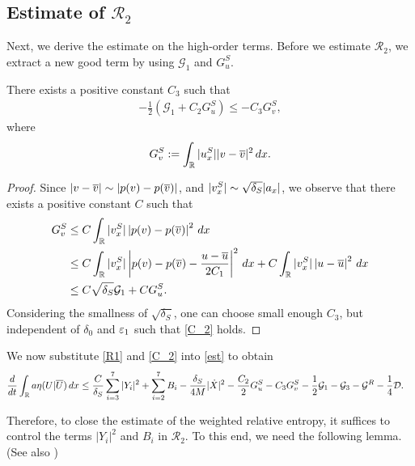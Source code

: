 \documentclass[11pt,reqno]{amsart}
\begin{document}
\subsection{Estimate of $\mathcal{R}_2$} \label{Est-Remaining-terms} 
Next, we derive the estimate on the high-order terms. Before we estimate $\mathcal{R}_2$, we extract a new good term by using $\mathcal{G}_1$ and $G^S_u$.
\begin{lemma} There exists a positive constant $C_3$ such that
    \begin{align} \label{C_2}
        -\frac{1}{2}( \mathcal{G}_1 +C_2 G^S_u ) \le -C_3 G^S_v, 
    \end{align}
where 
\begin{align*} %
    G^S_v:=\int_\mathbb{R}|\us_x||v-\ov|^2 \, dx .
\end{align*}
\end{lemma}
\begin{proof}
    Since $|v-\overline{v}|\sim|p(v)-p(\overline{v})|$, and $|v^S_x| \sim \sqrt{\delta_S}|a_x|$, we observe that there exists a positive constant $C$ such that 
    \begin{align*}
        G^S_v &\le C \int_\mathbb{R} |v^S_x| \left|p(v)-p(\overline{v})\right|^2 \, dx  \\ 
        &\le C  \int_\mathbb{R} |v^S_x| \left|p(v)-p(\overline{v}) - \frac{u-\overline{u}}{2C_1}\right|^2 \, dx +C  \int_\mathbb{R} |v^S_x| \left|u-\overline{u}\right|^2 \, dx \\ 
        &\le C \sqrt{\delta_S} \mathcal{G}_1 + C G^S_u.
   \end{align*}
Considering the smallness of $\sqrt{\delta_S}$, one can choose small enough $C_3$, but independent of $\delta_0$ and $\varepsilon_1$ such that \eqref{C_2} holds.
\end{proof}
    
We now substitute \eqref{R1} and \eqref{C_2} into \eqref{est} to obtain
\begin{equation}\label{est-R}
    \begin{aligned}{}
    \frac{d}{dt} \int_\mathbb{R} a \eta(U|\overline{U}) \, dx &\le \frac{C}{\delta_S}\sum_{i=3}^7 |Y_i|^2 +\sum_{i=2}^7B_i 
     -\frac{\delta_S}{4M} |\dot{X}|^2 -\frac{C_2}{2}G^S_u -C_3 G^S_v -\frac{1}{2}\mathcal{G}_1-\mathcal{G}_3 -\mathcal{G}^R-\frac{1}{4}\mathcal{D}.
    \end{aligned}
\end{equation}

Therefore, to close the estimate of the weighted relative entropy, it suffices to control the terms $|Y_i|^2$ and  $B_i$ in $\mathcal{R}_2$. To this end, we need the following lemma. (See also \cite{HKKL_pre})
\end{document}
